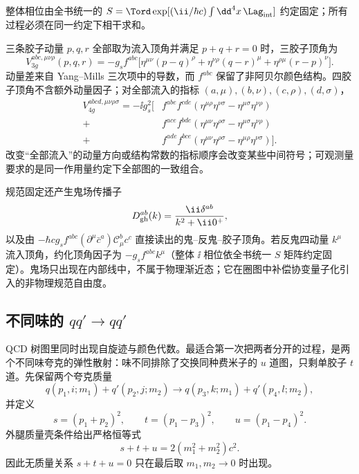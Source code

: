 整体相位由全书统一的
$S=\Tord\exp[(\ii/\hbar c)\int\dd^4 x\,\Lag_{\rm int}]$
约定固定；所有过程必须在同一约定下相干求和。

三条胶子动量 $p,q,r$ 全部取为流入顶角并满足 $p+q+r=0$ 时，三胶子顶角为
\begin{equation}
 {
 V_{3g}^{abc,\mu\nu\rho}(p,q,r)
 =-g_sf^{abc}\Big[
 \eta^{\mu\nu}(p-q)^\rho
 +\eta^{\nu\rho}(q-r)^\mu
 +\eta^{\rho\mu}(r-p)^\nu
 \Big].}
 \label{eq:qcd-three-gluon-vertex-dp10}
\end{equation}
动量差来自 Yang--Mills 三次项中的导数，而 $f^{abc}$ 保留了非阿贝尔颜色结构。四胶子顶角不含额外动量因子；对全部流入的指标 $(a,\mu),(b,\nu),(c,\rho),(d,\sigma)$，
\begin{align*}
 V_{4g}^{abcd,\mu\nu\rho\sigma}
 =-\ii g_s^2\Big[
 &f^{abe}f^{cde}(\eta^{\mu\rho}\eta^{\nu\sigma}-\eta^{\mu\sigma}\eta^{\nu\rho})\\
 +&f^{ace}f^{bde}(\eta^{\mu\nu}\eta^{\rho\sigma}-\eta^{\mu\sigma}\eta^{\nu\rho})\\
 +&f^{ade}f^{bce}(\eta^{\mu\nu}\eta^{\rho\sigma}-\eta^{\mu\rho}\eta^{\nu\sigma})
 \Big].
\end{align*}
改变“全部流入”的动量方向或结构常数的指标顺序会改变某些中间符号；可观测量要求的是同一作用量约定下全部图的一致组合。

规范固定还产生鬼场传播子
\begin{equation*}
 D_{\rm gh}^{ab}(k)=\frac{\ii\delta^{ab}}{k^2+\ii0^+},
\end{equation*}
以及由 $-\hbar c g_sf^{abc}(\partial^\mu\bar c^a)\mathscr C_\mu^b c^c$ 直接读出的鬼--反鬼--胶子顶角。若反鬼四动量 $k^\mu$ 流入顶角，约化顶角因子为 $-g_sf^{abc}k^\mu$（整体 $\ii$ 相位依全书统一 $S$ 矩阵约定固定）。鬼场只出现在内部线中，不属于物理渐近态；它在圈图中补偿协变量子化引入的非物理规范自由度。



\subsection{不同味的 $qq'\to qq'$}

QCD 树图里同时出现自旋迹与颜色代数。最适合第一次把两者分开的过程，是两个不同味夸克的弹性散射：味不同排除了交换同种费米子的 $u$ 道图，只剩单胶子 $t$ 道。先保留两个夸克质量
\begin{equation*}
 q(p_1,i;m_1)+q'(p_2,j;m_2)
 \longrightarrow
 q(p_3,k;m_1)+q'(p_4,l;m_2),
\end{equation*}
并定义
\begin{equation*}
 s=(p_1+p_2)^2,
 \qquad
 t=(p_1-p_3)^2,
 \qquad
 u=(p_1-p_4)^2.
\end{equation*}
外腿质量壳条件给出严格恒等式
\begin{equation}
 {s+t+u=2(m_1^2+m_2^2)c^2.}
 \label{eq:qqprime-mandelstam-massive-dp115}
\end{equation}
因此无质量关系 $s+t+u=0$ 只在最后取 $m_1,m_2\to0$ 时出现。

